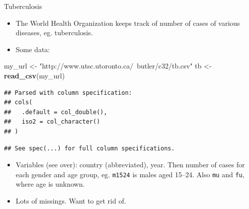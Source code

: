 \documentclass[ignorenonframetext,]{beamer}
\newenvironment{Shaded}{\begin{snugshade}}{\end{snugshade}}
\newcommand{\KeywordTok}[1]{\textcolor[rgb]{0.13,0.29,0.53}{\textbf{#1}}}
\newcommand{\NormalTok}[1]{#1}
\newcommand{\StringTok}[1]{\textcolor[rgb]{0.31,0.60,0.02}{#1}}
\providecommand{\tightlist}{%
  \setlength{\itemsep}{0pt}\setlength{\parskip}{0pt}}
\begin{document}
\begin{frame}[fragile]{Tuberculosis}
\protect\hypertarget{tuberculosis}{}

\begin{itemize}
\tightlist
\item
  The World Health Organization keeps track of number of cases of
  various diseases, eg. tuberculosis.
\item
  Some data:
\end{itemize}

\begin{Shaded}
\begin{Highlighting}[]
\NormalTok{my_url <-}\StringTok{ "http://www.utsc.utoronto.ca/~butler/c32/tb.csv"}
\NormalTok{tb <-}\StringTok{ }\KeywordTok{read_csv}\NormalTok{(my_url)}
\end{Highlighting}
\end{Shaded}

\begin{verbatim}
## Parsed with column specification:
## cols(
##   .default = col_double(),
##   iso2 = col_character()
## )
\end{verbatim}

\begin{verbatim}
## See spec(...) for full column specifications.
\end{verbatim}

\begin{itemize}
\tightlist
\item
  Variables (see over): country (abbreviated), year. Then number of
  cases for each gender and age group, eg. \texttt{m1524} is males aged
  15--24. Also \texttt{mu} and \texttt{fu}, where age is unknown.
\item
  Lots of missings. Want to get rid of.
\end{itemize}

\end{frame}
\end{document}
